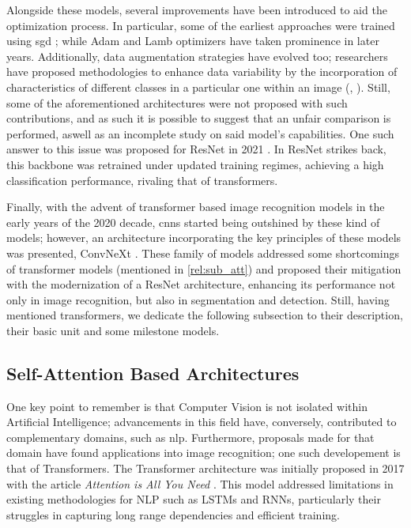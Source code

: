 Alongside these models, several improvements have been introduced to aid the optimization process. 
In particular, some of the earliest approaches were trained using \gls{sgd} 
\autocite{bottou2010large}; while Adam \autocite{kingma2014adam} and Lamb \autocite{you2019large} 
optimizers have taken prominence in later years. Additionally, data augmentation strategies have 
evolved too; researchers have proposed methodologies to enhance data variability by the 
incorporation of characteristics of different classes in a particular one within an image 
(\cite{zhang2017mixup}, \cite{yun2019cutmix}). Still, some of the aforementioned architectures 
were not proposed with such contributions, and as such it is possible to suggest that an unfair 
comparison is performed, aswell as an incomplete study on said model's capabilities. One such 
answer to this issue was proposed for ResNet in 2021 \autocite{wightman2021resnet}. In 
ResNet strikes back, this backbone was retrained under updated training regimes, achieving a 
high classification performance, rivaling that of transformers.

Finally, with the advent of transformer based image recognition models in the early years of the 
2020 decade, \glspl{cnn} started being outshined by these kind of models; however, an architecture 
incorporating the key principles of these models was presented, ConvNeXt \autocite{liu2022convnet}.
These family of models addressed some shortcomings of transformer models (mentioned in 
\autoref{rel:sub_att}) and proposed their mitigation with the modernization of a ResNet 
architecture, enhancing its performance not only in image recognition, but also in segmentation and 
detection. Still, having mentioned transformers, we dedicate the following subsection to their 
description, their basic unit and some milestone models.


\subsection{Self-Attention Based Architectures}
\label{rel:sub_att}
One key point to remember is that Computer Vision is not isolated within Artificial 
Intelligence; advancements in this field have, conversely, contributed to complementary domains, 
such as \gls{nlp}. Furthermore, proposals made for that domain have found applications into image 
recognition; one such developement is that of Transformers. The Transformer architecture was 
initially proposed in 2017 with the article \emph{Attention is All You Need} 
\autocite{vaswani2017attention}. This model addressed limitations in existing methodologies for 
NLP such as LSTMs and RNNs, particularly their struggles in capturing long range dependencies 
and efficient training. 

